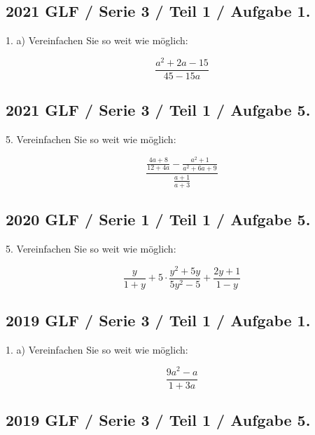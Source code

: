 
\subsection*{2021 GLF / Serie 3 / Teil 1 / Aufgabe 1.}

1. a) Vereinfachen Sie so weit wie möglich:

$$\frac{a^2+2a-15}{45-15a}$$



\subsection*{2021 GLF / Serie 3 / Teil 1 / Aufgabe 5.}

5. Vereinfachen Sie so weit wie möglich:

$$\frac{\frac{4a+8}{12+4a} - \frac{a^2+1}{a^2+6a+9}}{\frac{a+1}{a+3}}$$


\subsection*{2020 GLF / Serie 1 / Teil 1 / Aufgabe 5.}

5. Vereinfachen Sie so weit wie möglich:

$$\frac{y}{1+y} + 5\cdot{} \frac{y^2+5y}{5y^2-5} + \frac{2y+1}{1-y}$$


\subsection*{2019 GLF / Serie 3 / Teil 1 / Aufgabe 1.}

1. a) Vereinfachen Sie so weit wie möglich:

$$\frac{9a^2-a}{1+3a}$$


\subsection*{2019 GLF / Serie 3 / Teil 1 / Aufgabe 5.}

